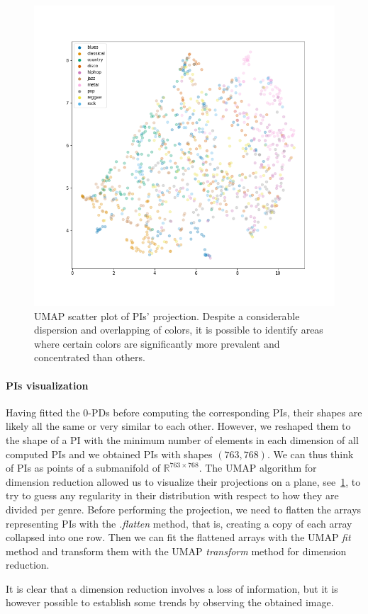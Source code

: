 \documentclass[english, LaM, oneside, noexaminfo]{sapthesis}
\begin{document}
\begin{figure}
\centering
\includegraphics[width=.65\textwidth]{umap_genres.png}
\caption{UMAP scatter plot of PIs' projection. Despite a considerable dispersion and overlapping of colors, it is possible to identify areas where certain colors are significantly more prevalent and concentrated than others.}\label{fig:UMAPlot}
\end{figure}

 
\paragraph{PIs visualization} Having fitted the $0$-PDs before computing the corresponding PIs, their shapes are likely all the same or very similar to each other. However, we reshaped them to the shape of a PI with the minimum number of elements in each dimension of all computed PIs and we obtained PIs with shapes $(763,768)$. We can thus think of PIs as points of a submanifold of $\mathbb{R}^{763\times768}$. The UMAP algorithm for dimension reduction \cite{mcinnes2020umap} allowed us to visualize their projections on a plane, see~\cref{fig:UMAPlot}, to try to guess any regularity in their distribution with respect to how they are divided per genre. Before performing the projection, we need to flatten the arrays representing PIs with the \textit{.flatten} method, that is, creating a copy of each array collapsed into one row. Then we can fit the flattened arrays with the UMAP \textit{fit} method and transform them with the UMAP \textit{transform} method for dimension reduction.

It is clear that a dimension reduction involves a loss of information, but it is however possible to establish some trends by observing the obtained image.
\end{document}
